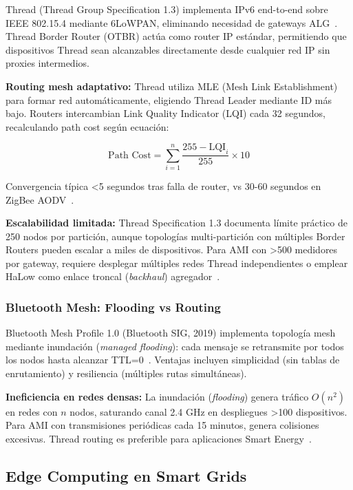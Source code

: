 Thread (Thread Group Specification 1.3) implementa IPv6 end-to-end sobre IEEE 802.15.4 mediante 6LoWPAN, eliminando necesidad de gateways ALG~\cite{threadMatterConvergence2024}. Thread Border Router (OTBR) actúa como router IP estándar, permitiendo que dispositivos Thread sean alcanzables directamente desde cualquier red IP sin proxies intermedios.

\textbf{Routing mesh adaptativo:} Thread utiliza MLE (Mesh Link Establishment) para formar red automáticamente, eligiendo Thread Leader mediante ID más bajo. Routers intercambian Link Quality Indicator (LQI) cada 32 segundos, recalculando path cost según ecuación:

\begin{equation}
\text{Path Cost} = \sum_{i=1}^{n} \frac{255 - \text{LQI}_i}{255} \times 10
\end{equation}

Convergencia típica <5 segundos tras falla de router, vs 30-60 segundos en ZigBee AODV~\cite{openthread2024}.

\textbf{Escalabilidad limitada:} Thread Specification 1.3 documenta límite práctico de 250 nodos por partición, aunque topologías multi-partición con múltiples Border Routers pueden escalar a miles de dispositivos. Para AMI con >500 medidores por gateway, requiere desplegar múltiples redes Thread independientes o emplear HaLow como enlace troncal (\textit{backhaul}) agregador~\cite{abdulsalamOverviewRecentWireless2024}.

\subsubsection{Bluetooth Mesh: Flooding vs Routing}

Bluetooth Mesh Profile 1.0 (Bluetooth SIG, 2019) implementa topología mesh mediante inundación (\textit{managed flooding}): cada mensaje se retransmite por todos los nodos hasta alcanzar TTL=0~\cite{bluetoothsig2019}. Ventajas incluyen simplicidad (sin tablas de enrutamiento) y resiliencia (múltiples rutas simultáneas).

\textbf{Ineficiencia en redes densas:} La inundación (\textit{flooding}) genera tráfico $O(n^2)$ en redes con $n$ nodos, saturando canal 2.4 GHz en despliegues >100 dispositivos. Para AMI con transmisiones periódicas cada 15 minutos, genera colisiones excesivas. Thread routing es preferible para aplicaciones Smart Energy~\cite{choudharyInternetThingsComprehensive2024}.

\subsection{Edge Computing en Smart Grids}
\label{sec:marco-estado-edge}

